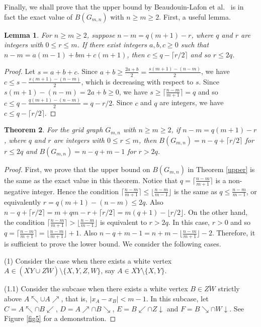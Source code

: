 \documentclass[preprint,12pt]{elsarticle}
\newtheorem{theorem}{Theorem}
\newtheorem{lemma}[theorem]{Lemma}
\def\NEarrow#1{#1{\nearrow}}
\def\SEarrow#1{#1{\searrow}}
\def\NWarrow#1{#1{\nwarrow}}
\def\SWarrow#1{#1{\swarrow}}
\def\Southarrow#1{#1{\downarrow}}
\begin{document}
{Finally, we shall prove that the upper bound by Beaudouin-Lafon et al.~\cite{2020bccknt}
is in fact the exact value of $B(G_{m,n})$ with $n\ge m\ge 2$.
First, a useful lemma.

\begin{lemma}\label{lem8}
For $n\ge m\ge 2$, suppose $n-m=q(m+1)-r$,
where $q$ and $r$ are integers with $0\le r\le m$.
If there exist integers $a,b,c\ge 0$ such that $n-m=a(m-1)+bm+c(m+1)$,
then $c\le q-\lceil r/2\rceil$ and so $r\le 2q$.
\end{lemma}
\begin{proof}
Let $s=a+b+c$.
Since $a+b\ge \frac{2a+b}{2}=\frac{s(m+1)-(n-m)}{2}$,
we have $c\le s-\frac{s(m+1)-(n-m)}{2}$,
which is decreasing with respect to $s$.
Since $s(m+1)-(n-m)=2a+b\ge 0$,
we have $s\ge\lceil\frac{n-m}{m+1}\rceil=q$
and so $c\le q-\frac{q(m+1)-(n-m)}{2}=q-{r}/{2}$.
Since $c$ and $q$ are integers,
we have $c\le q-\lceil r/2\rceil$.
\end{proof}


\begin{theorem}\label{thm9}
For the grid graph $G_{m,n}$ with $n\ge m\ge 2$,
if $n-m=q(m+1)-r$, where $q$ and $r$ are integers with $0\le r\le m$,
then $B(G_{m,n})=n-q+\lceil r/2\rceil$ for $r\le 2q$
and $B(G_{m,n})=n-q+m-1$ for $r>2q$.
\end{theorem}
\begin{proof}
First, we prove that the upper bound on $B(G_{m,n})$
in Theorem \ref{upper} is the same as the exact value in this theorem.
Notice that $q=\lceil\frac{n-m}{m+1}\rceil$ is a non-negative integer.
Hence the condition $\lceil\frac{n-m}{m+1}\rceil\le\lfloor\frac{n-m}{m-1}\rfloor$ is
the same as $q\le\frac{n-m}{m-1}$, or equivalently $r=q(m+1)-(n-m)\le 2q$.
Also $n-q+\lceil r/2\rceil = m+qm-r+\lceil r/2\rceil = m(q+1)-\lfloor r/2\rfloor$.
On the other hand, the condition
$\lceil\frac{n-m}{m+1}\rceil > \lfloor\frac{n-m}{m-1}\rfloor$ is equivalent to $r>2q$.
In this case, $r>0$ and so $q=\lceil\frac{n-m}{m+1}\rceil=\lfloor\frac{n-m}{m+1}\rfloor+1$.
Also $n-q+m-1=n+m-\lfloor\frac{n-m}{m+1}\rfloor-2$.
Therefore, it is sufficient to prove the lower bound.
We consider the following cases.

(1)
Consider the case when there exists a white vertex
$A\in(\overline{XY}\cup\overline{ZW})\setminus\{X,Y,Z,W\}$,
say $A\in\overline{XY}\setminus\{X,Y\}$.

(1.1)
Consider the subcase when there exists a white vertex $B\in\overline{ZW}$
strictly above $\NWarrow{A}\cup\NEarrow{A}$, that is, $|x_A-x_B|<m-1$.
In this subcase, let
$C=\NWarrow{A}\cap\SWarrow{B}$, $D=\NEarrow{A}\cap\SEarrow{B}$,
$E=\SWarrow{B}\cap\Southarrow{Z}$ and $F=\SEarrow{B}\cap\Southarrow{W}$.
See Figure \ref{fig5} for a demonstration.



\end{proof}}
\end{document}
